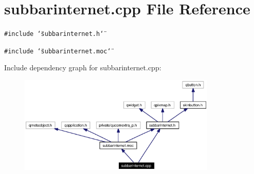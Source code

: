 \section{subbarinternet.cpp File Reference}
\label{subbarinternet_8cpp}


{\tt \#include \char`\"{}subbarinternet.h\char`\"{}}\par
{\tt \#include \char`\"{}subbarinternet.moc\char`\"{}}\par


Include dependency graph for subbarinternet.cpp:\begin{figure}[H]
\begin{center}
\leavevmode
\includegraphics[width=266pt]{subbarinternet_8cpp__incl}
\end{center}
\end{figure}
